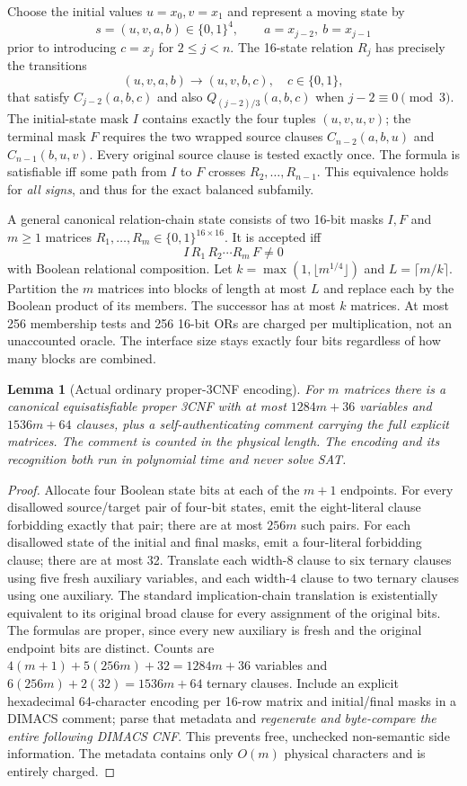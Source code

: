 \documentclass[11pt]{article}
\newtheorem{lemma}[theorem]{Lemma}
\begin{document}
Choose the initial values $u=x_0,v=x_1$ and represent a moving state by
\[
 s=(u,v,a,b)\in\{0,1\}^4, \qquad a=x_{j-2},\ b=x_{j-1}
\]
prior to introducing $c=x_j$ for $2\le j<n$. The 16-state relation $R_j$ has precisely the transitions
\[
 (u,v,a,b)\longrightarrow(u,v,b,c),\quad c\in\{0,1\},
\]
that satisfy $C_{j-2}(a,b,c)$ and also $Q_{(j-2)/3}(a,b,c)$ when $j-2\equiv0\pmod3$. The initial-state mask $I$ contains exactly the four tuples $(u,v,u,v)$; the terminal mask $F$ requires the two wrapped source clauses $C_{n-2}(a,b,u)$ and $C_{n-1}(b,u,v)$. Every original source clause is tested exactly once. The formula is satisfiable iff some path from $I$ to $F$ crosses $R_2,\ldots,R_{n-1}$. This equivalence holds for \emph{all signs}, and thus for the exact balanced subfamily.

A general canonical relation-chain state consists of two 16-bit masks $I,F$ and $m\ge1$ matrices $R_1,\ldots,R_m\in\{0,1\}^{16\times16}$. It is accepted iff
\[
 I\,R_1\,R_2\cdots R_m\,F\ne0
\]
with Boolean relational composition. Let $k=\max(1,\lfloor m^{1/4}\rfloor)$ and $L=\lceil m/k\rceil$. Partition the $m$ matrices into blocks of length at most $L$ and replace each by the Boolean product of its members. The successor has at most $k$ matrices. At most 256 membership tests and 256 16-bit ORs are charged per multiplication, not an unaccounted oracle. The interface size stays exactly four bits regardless of how many blocks are combined.

\begin{lemma}[Actual ordinary proper-3CNF encoding]
For $m$ matrices there is a canonical equisatisfiable proper 3CNF with at most $1284m+36$ variables and $1536m+64$ clauses, plus a self-authenticating comment carrying the full explicit matrices. The comment is counted in the physical length. The encoding and its recognition both run in polynomial time and never solve SAT.
\end{lemma}
\begin{proof}
Allocate four Boolean state bits at each of the $m+1$ endpoints. For every disallowed source/target pair of four-bit states, emit the eight-literal clause forbidding exactly that pair; there are at most $256m$ such pairs. For each disallowed state of the initial and final masks, emit a four-literal forbidding clause; there are at most 32. Translate each width-$8$ clause to six ternary clauses using five fresh auxiliary variables, and each width-$4$ clause to two ternary clauses using one auxiliary. The standard implication-chain translation is existentially equivalent to its original broad clause for every assignment of the original bits. The formulas are proper, since every new auxiliary is fresh and the original endpoint bits are distinct. Counts are $4(m+1)+5(256m)+32=1284m+36$ variables and $6(256m)+2(32)=1536m+64$ ternary clauses. Include an explicit hexadecimal 64-character encoding per 16-row matrix and initial/final masks in a DIMACS comment; parse that metadata and \emph{regenerate and byte-compare the entire following DIMACS CNF}. This prevents free, unchecked non-semantic side information. The metadata contains only $O(m)$ physical characters and is entirely charged.
\end{proof}
\end{document}
